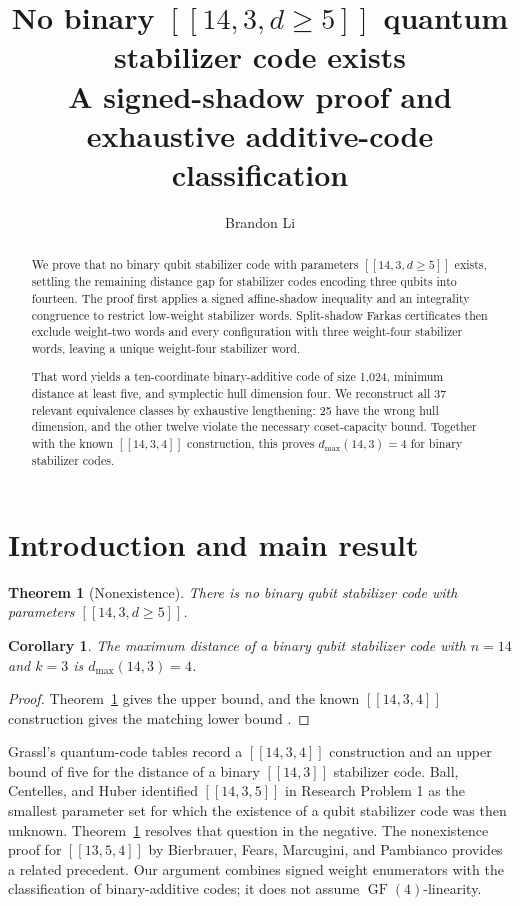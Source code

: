 \documentclass[11pt]{article}
\title{No binary \(\left[\!\left[14,3,d\geq 5\right]\!\right]\) quantum stabilizer code exists\\[0.7em]
\large\mdseries A signed-shadow proof and exhaustive additive-code classification}
\author{Brandon Li}
\date{}
\newtheorem{theorem}{Theorem}
\newtheorem*{corollary*}{Corollary}
\begin{document}
\maketitle
\begin{abstract}
We prove that no binary qubit stabilizer code with parameters
\(\left[\!\left[14,3,d\ge 5\right]\!\right]\) exists, settling the
remaining distance gap for stabilizer codes encoding three qubits into
fourteen. The proof first applies a signed affine-shadow inequality and
an integrality congruence to restrict low-weight stabilizer words.
Split-shadow Farkas certificates then exclude weight-two words
and every configuration with three weight-four stabilizer words, leaving
a unique weight-four stabilizer word.

That word yields a ten-coordinate binary-additive code of size 1,024,
minimum distance at least five, and symplectic hull dimension four. We
reconstruct all 37 relevant equivalence classes by exhaustive
lengthening: 25 have the wrong hull dimension, and the other twelve
violate the necessary coset-capacity bound. Together with the known
\(\left[\!\left[14,3,4\right]\!\right]\) construction, this proves
\(d_{\max}(14,3)=4\) for binary stabilizer codes.
\end{abstract}

\section{Introduction and main result}\label{introduction-and-main-result}

\begin{theorem}[Nonexistence]\label{thm:main}
There is no binary qubit stabilizer code with parameters \(\left[\!\left[14,3,d\ge 5\right]\!\right]\).
\end{theorem}

\begin{corollary*}
The maximum distance of a binary qubit stabilizer code with \(n=14\) and \(k=3\) is \(d_{\max}(14,3)=4\).
\end{corollary*}
\begin{proof}
Theorem~\ref{thm:main} gives the upper bound, and the known
\(\left[\!\left[14,3,4\right]\!\right]\) construction gives the matching lower bound
\cite{grassl-table}.
\end{proof}

Grassl's quantum-code tables \cite{grassl-table} record a \(\left[\!\left[14,3,4\right]\!\right]\) construction and an upper bound of five for the distance of a binary \(\left[\!\left[14,3\right]\!\right]\) stabilizer code. Ball, Centelles, and Huber \cite{ball-centelles-huber} identified \(\left[\!\left[14,3,5\right]\!\right]\) in Research Problem 1 as the smallest parameter set for which the existence of a qubit stabilizer code was then unknown. Theorem~\ref{thm:main} resolves that question in the negative. The nonexistence proof for \(\left[\!\left[13,5,4\right]\!\right]\) by Bierbrauer, Fears, Marcugini, and Pambianco \cite{bierbrauer-et-al} provides a related precedent. Our argument combines signed weight enumerators \cite{rains-weight,rains-shadow} with the classification of binary-additive codes; it does not assume \(\operatorname{GF}(4)\)-linearity.
\end{document}

